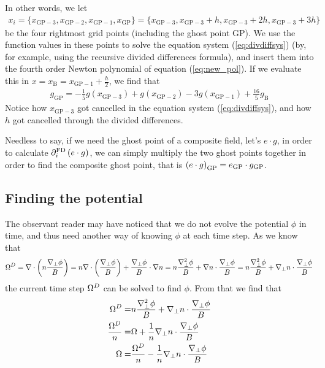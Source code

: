 In other words, we let
\begin{align*}
x_i =
\{x_{\text{GP}-3}, x_{\text{GP}-2}, x_{\text{GP}-1}, x_\text{GP}\}=
\{x_{\text{GP}-3}, x_{\text{GP}-3}+h, x_{\text{GP}-3}+2h, x_{\text{GP}-3}+3h\}
\end{align*}
%
be the four rightmost grid points (including the ghost point $\text{GP}$). We
use the function values in these points to solve the equation system
(\ref{eq:divdiffsys}) (by, for example, using the recursive divided differences
formula), and insert them into the fourth order Newton polynomial of equation
(\ref{eq:new_pol}). If we evaluate this in
$x=x_\text{B}=x_{\text{GP}-1} +\frac{h}{2}$, we find that
%
\begin{align*}
    g_\text{GP} =
    -\frac{1}{5}g(x_{\text{GP}-3})
    + g(x_{\text{GP}-2})
    -3g(x_{\text{GP}-1})
    +\frac{16}{5}g_{\text{B}}
\end{align*}
%
Notice how $x_{\text{GP}-3}$ got cancelled in the equation system
(\ref{eq:divdiffsys}), and how $h$ got cancelled through the divided differences.

Needless to say, if we need the ghost point of a composite field, let's $e\cdot
g$, in order to calculate $\partial_i^{\text{FD}} \left(e\cdot g\right)$, we can
simply multiply the two ghost points together in order to find the composite
ghost point, that is $\left(e \cdot g\right)_\text{GP} = e_\text{GP}\cdot g_\text{GP}$.


\subsection{Finding the potential}
The observant reader may have noticed that we do not evolve the potential $\phi$
in time, and thus need another way of knowing $\phi$ at each time step. As we
know that
%
\begin{align*}
    \Omega^D = \nabla\cdot\left(n\frac{\nabla_\perp\phi}{B}\right)
    = n\nabla\cdot\left(\frac{\nabla_\perp\phi}{B}\right) +
    \frac{\nabla_\perp\phi}{B}\cdot\nabla n
    = n\frac{\nabla_\perp^2\phi}{B} +
    \nabla n\cdot\frac{\nabla_\perp\phi}{B}
    = n\frac{\nabla_\perp^2\phi}{B} +
    \nabla_\perp n\cdot\frac{\nabla_\perp\phi}{B}
\end{align*}
%
the current time step $\Omega^D$ can be solved to find $\phi$. From that we find
that
%
\begin{align*}
    \Omega^D =& n\frac{\nabla_\perp^2\phi}{B} +
    \nabla_\perp n\cdot\frac{\nabla_\perp\phi}{B}
    \\
    \frac{\Omega^D}{n} =& \Omega +
    \frac{1}{n}\nabla_\perp n\cdot\frac{\nabla_\perp\phi}{B}
    \\
    \Omega =& \frac{\Omega^D}{n} -
    \frac{1}{n}\nabla_\perp n\cdot\frac{\nabla_\perp\phi}{B}
\end{align*}


